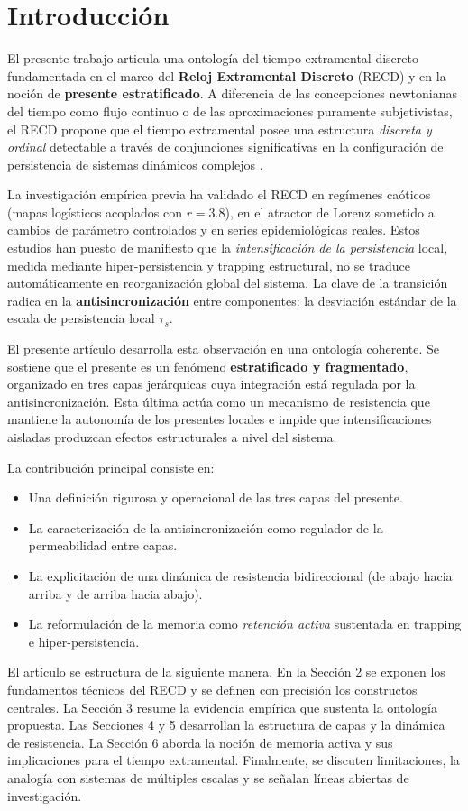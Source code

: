 \section{Introducción}

El presente trabajo articula una ontología del tiempo extramental discreto fundamentada en el marco del \textbf{Reloj Extramental Discreto} (RECD) y en la noción de \textbf{presente estratificado}. A diferencia de las concepciones newtonianas del tiempo como flujo continuo o de las aproximaciones puramente subjetivistas, el RECD propone que el tiempo extramental posee una estructura \textit{discreta y ordinal} detectable a través de conjunciones significativas en la configuración de persistencia de sistemas dinámicos complejos \citep{padilla_bayesian_accumulator_2026,padilla_sintesis_magna_2026}.

La investigación empírica previa ha validado el RECD en regímenes caóticos (mapas logísticos acoplados con $r=3.8$), en el atractor de Lorenz sometido a cambios de parámetro controlados y en series epidemiológicas reales. Estos estudios han puesto de manifiesto que la \textit{intensificación de la persistencia} local, medida mediante hiper-persistencia y trapping estructural, no se traduce automáticamente en reorganización global del sistema. La clave de la transición radica en la \textbf{antisincronización} entre componentes: la desviación estándar de la escala de persistencia local $\tau_s$.

El presente artículo desarrolla esta observación en una ontología coherente. Se sostiene que el presente es un fenómeno \textbf{estratificado y fragmentado}, organizado en tres capas jerárquicas cuya integración está regulada por la antisincronización. Esta última actúa como un mecanismo de resistencia que mantiene la autonomía de los presentes locales e impide que intensificaciones aisladas produzcan efectos estructurales a nivel del sistema.

La contribución principal consiste en:
\begin{itemize}
    \item Una definición rigurosa y operacional de las tres capas del presente.
    \item La caracterización de la antisincronización como regulador de la permeabilidad entre capas.
    \item La explicitación de una dinámica de resistencia bidireccional (de abajo hacia arriba y de arriba hacia abajo).
    \item La reformulación de la memoria como \textit{retención activa} sustentada en trapping e hiper-persistencia.
\end{itemize}

El artículo se estructura de la siguiente manera. En la Sección 2 se exponen los fundamentos técnicos del RECD y se definen con precisión los constructos centrales. La Sección 3 resume la evidencia empírica que sustenta la ontología propuesta. Las Secciones 4 y 5 desarrollan la estructura de capas y la dinámica de resistencia. La Sección 6 aborda la noción de memoria activa y sus implicaciones para el tiempo extramental. Finalmente, se discuten limitaciones, la analogía con sistemas de múltiples escalas y se señalan líneas abiertas de investigación.